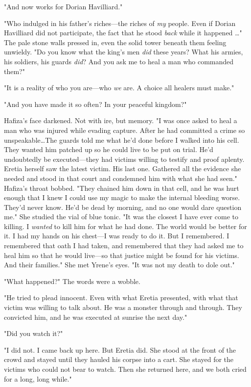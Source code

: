 "And now works for Dorian Havilliard."

"Who indulged in his father's riches---the riches of \emph{my} people.
Even if Dorian Havilliard did not participate, the fact that he stood \emph{back} while it happened \ldots" The pale stone walls pressed in, even the solid tower beneath them feeling unwieldy.
"Do you know what the king's men \emph{did} these years?
What his armies, his soldiers, his guards \emph{did}?
And you ask me to heal a man who commanded them?"

"It is a reality of who you are---who \emph{we} are.
A choice all healers must make."

"And you have made it so often?
In your peaceful kingdom?"

Hafiza's face darkened.
Not with ire, but memory.
"I was once asked to heal a man who was injured while evading capture.
After he had committed a crime so unspeakable\ldots The guards told me what he'd done before I walked into his cell.
They wanted him patched up so he could live to be put on trial.
He'd undoubtedly be executed---they had victims willing to testify and proof aplenty.
Eretia herself saw the latest victim.
His last one.
Gathered all the evidence she needed and stood in that court and condemned him with what she had seen."
Hafiza's throat bobbed.
"They chained him down in that cell, and he was hurt enough that I knew I could use my magic to make the internal bleeding worse.
They'd never know.
He'd be dead by morning, and no one would dare question me."
She studied the vial of blue tonic.
"It was the closest I have ever come to killing.
I \emph{wanted} to kill him for what he had done.
The world would be better for it.
I had my hands on his chest---I was ready to do it.
But I remembered.
I remembered that oath I had taken, and remembered that they had asked me to heal him so that he would live---so that justice might be found for his victims.
And their families."
She met Yrene's eyes.
"It was not my death to dole out."

"What happened?"
The words were a wobble.

"He tried to plead innocent.
Even with what Eretia presented, with what that victim was willing to talk about.
He was a monster through and through.
They convicted him, and he was executed at sunrise the next day."

"Did you watch it?"

"I did not.
I came back up here.
But Eretia did.
She stood at the front of the crowd and stayed until they hauled his corpse into a cart.
She stayed for the victims who could not bear to watch.
Then she returned here, and we both cried for a long, long while."

